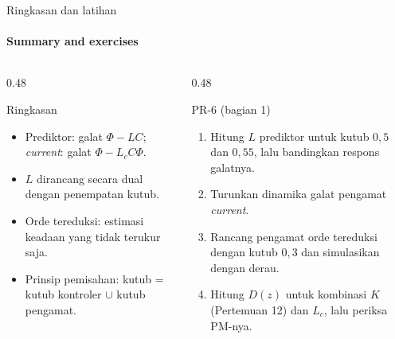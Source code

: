 \documentclass[aspectratio=169,10pt]{beamer}
\begin{document}
\begin{frame}{Ringkasan dan latihan}
	\framesubtitle{Summary and exercises}
	\begin{columns}[T]
		\begin{column}{0.48\textwidth}
			\begin{block}{Ringkasan}
				\small
				\begin{itemize}
					\item Prediktor: galat $\Phi - LC$; \textit{current}: galat $\Phi - L_cC\Phi$.
					\item $L$ dirancang secara dual dengan penempatan kutub.
					\item Orde tereduksi: estimasi keadaan yang tidak terukur saja.
					\item Prinsip pemisahan: kutub = kutub kontroler $\cup$ kutub pengamat.
				\end{itemize}
			\end{block}
		\end{column}
		\begin{column}{0.48\textwidth}
			\begin{exampleblock}{PR-6 (bagian 1)}
				\small
				\begin{enumerate}
					\item Hitung $L$ prediktor untuk kutub $0{,}5$ dan $0{,}55$, lalu bandingkan respons galatnya.
					\item Turunkan dinamika galat pengamat \textit{current}.
					\item Rancang pengamat orde tereduksi dengan kutub $0{,}3$ dan simulasikan dengan derau.
					\item Hitung $D(z)$ untuk kombinasi $K$ (Pertemuan 12) dan $L_c$, lalu periksa PM-nya.
				\end{enumerate}
			\end{exampleblock}
		\end{column}
	\end{columns}
\end{frame}
\end{document}
